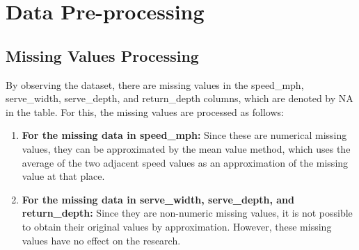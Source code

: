 \documentclass[12pt]{article}  %
\begin{document}
\section{Data Pre-processing}
\subsection{Missing Values Processing}
By observing the dataset, there are missing values in the speed\_mph, serve\_width, serve\_depth, and return\_depth columns, which are denoted by NA in the table. For this, the missing values are processed as follows:

\begin{enumerate}[\bfseries 1.]
	\setlength{\parsep}{0ex} 
	\setlength{\topsep}{2ex} 
	\setlength{\itemsep}{1ex} 
	\item \textbf{For the missing data in speed\_mph:} Since these are numerical missing values, they can be approximated by the mean value method, which uses the average of the two adjacent speed values as an approximation of the missing value at that place.
	
	\item \textbf{For the missing data in serve\_width, serve\_depth, and return\_depth:} Since they are non-numeric missing values, it is not possible to obtain their original values by approximation. However, these missing values have no effect on the research.
\end{enumerate}
\end{document}
